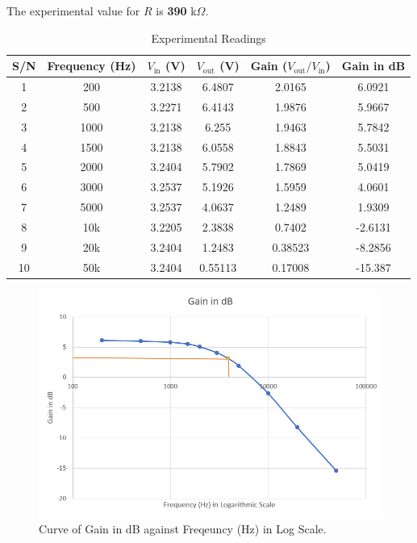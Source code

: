 \documentclass[a4paper,12pt,oneside, tikz]{book}
\begin{document}
The experimental value for $R$ is \textbf{390} k$\Omega$.

\begin{table}[H]
    \centering
    \begin{tabular}{|c|c|c|c|c|c|}
        \hline S/N & Frequency (Hz) & $V_\text{in}$ (V) & $V_\text{out}$ (V) & Gain ($V_\text{out}/V_\text{in}$) & Gain in dB \\
        \hline 1 & 200 & 3.2138 & 6.4807 & 2.0165 & 6.0921 \\
        \hline 2 & 500 & 3.2271 & 6.4143 & 
        1.9876 & 5.9667 \\
        \hline 3 & 1000 & 3.2138 & 6.255 & 1.9463 & 5.7842 \\
        \hline 4 & 1500 & 3.2138 & 6.0558 & 1.8843 & 5.5031 \\
        \hline 5 & 2000 & 3.2404 & 5.7902 & 1.7869 & 5.0419  \\
        \hline 6 & 3000 & 3.2537 & 5.1926 & 1.5959 & 4.0601 \\
        \hline 7 & 5000 & 3.2537 & 4.0637 & 1.2489 & 1.9309 \\
        \hline 8 & 10k & 3.2205 & 2.3838 & 0.7402 & -2.6131 \\
        \hline 9 & 20k & 3.2404 & 1.2483 & 0.38523 & -8.2856 \\
        \hline 10 & 50k & 3.2404 & 0.55113 & 0.17008 & -15.387 \\
        \hline
    \end{tabular}
    \caption{Experimental Readings}
    \label{tab:exp}
\end{table}

\begin{figure}[H]
    \centering
    \includegraphics{./images/gain.png}
    \caption{Curve of Gain in dB against Freqeuncy (Hz) in Log Scale.}
    \label{fig:gain}
\end{figure}
\end{document}

